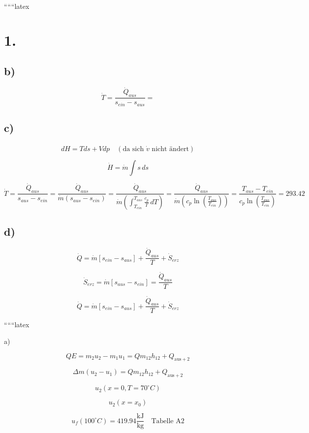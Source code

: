 
``````latex

\section*{1.}

\subsection*{b)}

\[
\dot{T} = \frac{\dot{Q}_{aus}}{s_{ein} - s_{aus}} = 
\]

\subsection*{c)}

\[
d\hat{H} = Tds + Vdp \quad (\text{da sich } \dot{v} \text{ nicht ändert})
\]

\[
\dot{H} = \dot{m} \int s \, ds
\]

\[
\dot{T} = \frac{\dot{Q}_{aus}}{s_{aus} - s_{ein}} = \frac{\dot{Q}_{aus}}{\dot{m} \left( s_{aus} - s_{ein} \right)} = \frac{\dot{Q}_{aus}}{\dot{m} \left( \int_{T_{ein}}^{T_{aus}} \frac{c_p}{T} \, dT \right)} = \frac{\dot{Q}_{aus}}{\dot{m} \left( c_p \ln \left( \frac{T_{aus}}{T_{ein}} \right) \right)} = \frac{T_{aus} - T_{ein}}{c_p \ln \left( \frac{T_{aus}}{T_{ein}} \right)} = 293.42
\]

\subsection*{d)}

\[
\dot{Q} = \dot{m} \left[ s_{ein} - s_{aus} \right] + \frac{\dot{Q}_{aus}}{T} + \dot{S}_{erz}
\]

\[
\dot{S}_{erz} = \dot{m} \left[ s_{aus} - s_{ein} \right] = \frac{\dot{Q}_{aus}}{T}
\]

\[
\dot{Q} = \dot{m} \left[ s_{ein} - s_{aus} \right] + \frac{\dot{Q}_{aus}}{T} + \dot{S}_{erz}
\]

``````latex


a)

\[
QE = m_2 u_2 - m_1 u_1 = Q m_{12} h_{12} + Q_{\text{aus} + 2}
\]

\[
\Delta m (u_2 - u_1) = Q m_{12} h_{12} + Q_{\text{aus} + 2}
\]

\[
u_2 (x = 0, T = 70^\circ C)
\]

\[
u_2 (x = x_0)
\]

\[
u_f (100^\circ C) = 419.94 \frac{\text{kJ}}{\text{kg}} \quad \text{Tabelle A2}
\]

